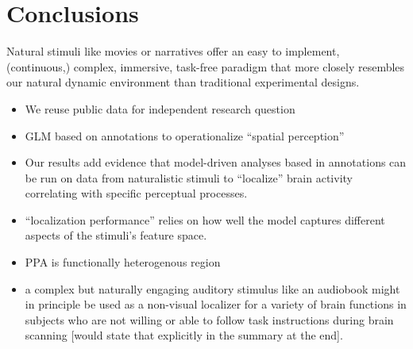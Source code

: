 \documentclass[english]{article}
\begin{document}
\section{Conclusions}



Natural stimuli like movies \citep{eickhoff2020towards,
hasson2008neurocinematics, sonkusare2019naturalistic} or narratives
\citep{hamilton2018revolution, honey2012not, lerner2011topographic,
silbert2014coupled, wilson2008beyond} offer an easy to implement, (continuous,)
complex, immersive, task-free paradigm that more closely resembles our natural
dynamic environment than traditional experimental designs.

\begin{itemize}
\item We reuse public data for independent research question
\item GLM based on annotations to operationalize ``spatial perception''
\item Our results add evidence that model-driven analyses based in annotations
can be run on data from naturalistic stimuli to ``localize'' brain activity
correlating with specific perceptual processes.
\item ``localization performance'' relies on how well the model captures
different aspects of the stimuli's feature space.
\item PPA is functionally heterogenous region
\item a complex but naturally engaging auditory stimulus like an
audiobook might in principle be used as a non-visual localizer for a variety of
brain functions in subjects who are not willing or able to follow task
instructions during brain scanning [would state that explicitly in the summary
at the end].
\end{itemize}

\end{document}
